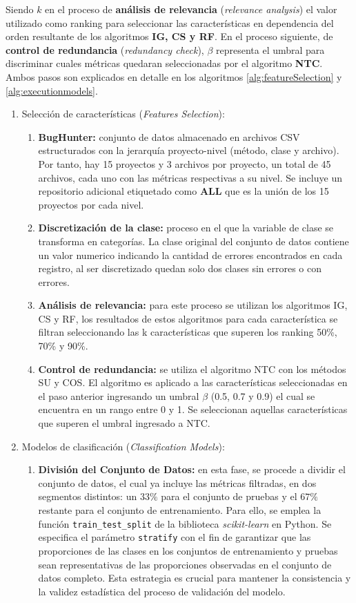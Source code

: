 Siendo $k$ en el proceso de \textbf{análisis de relevancia} (\textit{relevance analysis}) el valor utilizado como ranking para seleccionar las características en dependencia del orden resultante de los algoritmos  \textbf{IG, CS y RF}. En el proceso siguiente, de \textbf{control de redundancia} (\textit{redundancy check}), \(\beta \) representa el umbral para discriminar cuales métricas quedaran seleccionadas por el algoritmo \textbf {NTC}. 
Ambos pasos son explicados en detalle en los algoritmos \ref{alg:featureSelection} y \ref{alg:executionmodels}.
\begin{enumerate}
\item Selección de características (\textit{Features Selection}):
\begin{enumerate}
\item \textbf{BugHunter:} conjunto de datos almacenado en archivos CSV estructurados con la jerarquía proyecto-nivel (método, clase y archivo). Por tanto, hay 15 proyectos y 3 archivos por proyecto, un total de 45 archivos, cada uno con las métricas respectivas a su nivel. Se incluye un repositorio adicional etiquetado como \textbf{ALL} que es la unión de los 15 proyectos por cada nivel.
\item \textbf{Discretización de la clase:} proceso en el que la variable de clase se transforma en categorías. La clase original del conjunto de datos contiene un valor numerico indicando la cantidad de errores encontrados en cada registro, al ser discretizado quedan solo dos clases sin errores o con errores.
\item \textbf{Análisis de relevancia:}  para este proceso se utilizan los algoritmos IG, CS y RF, los resultados de estos algoritmos para cada característica se filtran seleccionando las k características que superen los ranking 50\%, 70\% y 90\%.
\item \textbf{Control de redundancia:} se utiliza el algoritmo NTC con los métodos SU y COS. El algoritmo es aplicado a las características seleccionadas en el paso anterior ingresando un umbral \(\beta\) (0.5, 0.7 y 0.9) el cual se encuentra en un rango entre 0 y 1. Se seleccionan aquellas características que superen el umbral ingresado a NTC.
\end{enumerate}

\item Modelos de clasificación (\textit{Classification Models}):
\begin{enumerate}
\item \textbf{División del Conjunto de Datos:} en esta fase, se procede a dividir el conjunto de datos, el cual ya incluye las métricas filtradas, en dos segmentos distintos: un \(33\%\) para el conjunto de pruebas y el \(67\%\) restante para el conjunto de entrenamiento. Para ello, se emplea la función \texttt{train\_test\_split} de la biblioteca \textit{scikit-learn} en Python. Se especifica el parámetro \texttt{stratify} con el fin de garantizar que las proporciones de las clases en los conjuntos de entrenamiento y pruebas sean representativas de las proporciones observadas en el conjunto de datos completo. Esta estrategia es crucial para mantener la consistencia y la validez estadística del proceso de validación del modelo.


\end{enumerate}
\end{enumerate}
